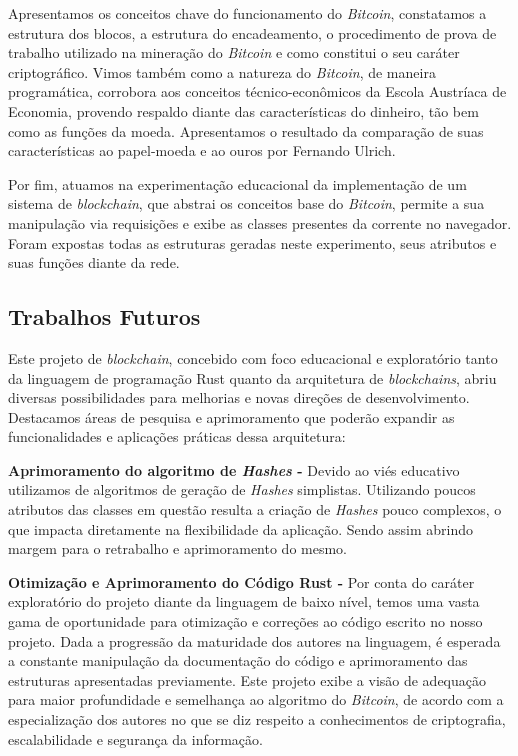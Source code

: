 \documentclass[article,12pt,oneside,a4paper,english,brazil]{unifil}
\begin{document}
\begin{Spacing}{1.5}
Apresentamos os conceitos chave do funcionamento do \textit{Bitcoin}, constatamos a estrutura dos blocos, a estrutura do encadeamento, o procedimento de prova de trabalho utilizado na mineração do \textit{Bitcoin} e como constitui o seu caráter criptográfico. Vimos também como a natureza do \textit{Bitcoin}, de maneira programática, corrobora aos conceitos técnico-econômicos da Escola Austríaca de Economia, provendo respaldo diante das características do dinheiro, tão bem como as funções da moeda. Apresentamos o resultado da comparação de suas características ao papel-moeda e ao ouros por Fernando Ulrich.

Por fim, atuamos na experimentação educacional da implementação de um sistema de \textit{blockchain}, que abstrai os conceitos base do \textit{Bitcoin}, permite a sua manipulação via requisições e exibe as classes presentes da corrente no navegador. Foram expostas todas as estruturas geradas neste experimento, seus atributos e suas funções diante da rede.

\subsection*{Trabalhos Futuros}

Este projeto de \textit{blockchain}, concebido com foco educacional e exploratório tanto da linguagem de programação Rust quanto da arquitetura de \textit{blockchains}, abriu diversas possibilidades para melhorias e novas direções de desenvolvimento. Destacamos áreas de pesquisa e aprimoramento que poderão expandir as funcionalidades e aplicações práticas dessa arquitetura:

\textbf{Aprimoramento do algoritmo de \textit{Hashes} - }Devido ao viés educativo utilizamos de algoritmos de geração de \textit{Hashes} simplistas. Utilizando poucos atributos das classes em questão resulta a criação de \textit{Hashes} pouco complexos, o que impacta diretamente na flexibilidade da aplicação. Sendo assim abrindo margem para o retrabalho e aprimoramento do mesmo.

\textbf{Otimização e Aprimoramento do Código Rust - }Por conta do caráter exploratório do projeto diante da linguagem de baixo nível, temos uma vasta gama de oportunidade para otimização e correções ao código escrito no nosso projeto. Dada a progressão da maturidade dos autores na linguagem, é esperada a constante manipulação da documentação do código e aprimoramento das estruturas apresentadas previamente. Este projeto exibe a visão de adequação para maior profundidade e semelhança ao algoritmo do \textit{Bitcoin}, de acordo com a especialização dos autores no que se diz respeito a conhecimentos de criptografia, escalabilidade e segurança da informação.


\end{Spacing}
\end{document}
